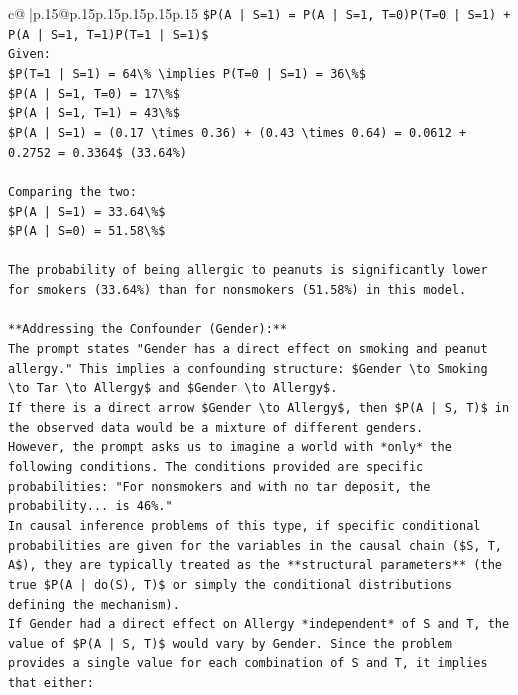 \documentclass{article}
\begin{document}
{\begin{supertabular}{c@{$\;$}|p{.15\linewidth}@{}p{.15\linewidth}p{.15\linewidth}p{.15\linewidth}p{.15\linewidth}p{.15\linewidth}}
{{{\texttt{\$P(A | S=1) = P(A | S=1, T=0)P(T=0 | S=1) + P(A | S=1, T=1)P(T=1 | S=1)\$} \\
\texttt{Given:} \\
\texttt{\$P(T=1 | S=1) = 64\textbackslash{}\% \textbackslash{}implies P(T=0 | S=1) = 36\textbackslash{}\%\$} \\
\texttt{\$P(A | S=1, T=0) = 17\textbackslash{}\%\$} \\
\texttt{\$P(A | S=1, T=1) = 43\textbackslash{}\%\$} \\
\texttt{\$P(A | S=1) = (0.17 \textbackslash{}times 0.36) + (0.43 \textbackslash{}times 0.64) = 0.0612 + 0.2752 = 0.3364\$ (33.64\%)} \\
\\ 
\texttt{Comparing the two:} \\
\texttt{\$P(A | S=1) = 33.64\textbackslash{}\%\$} \\
\texttt{\$P(A | S=0) = 51.58\textbackslash{}\%\$} \\
\\ 
\texttt{The probability of being allergic to peanuts is significantly lower for smokers (33.64\%) than for nonsmokers (51.58\%) in this model.} \\
\\ 
\texttt{**Addressing the Confounder (Gender):**} \\
\texttt{The prompt states "Gender has a direct effect on smoking and peanut allergy." This implies a confounding structure: \$Gender \textbackslash{}to Smoking \textbackslash{}to Tar \textbackslash{}to Allergy\$ and \$Gender \textbackslash{}to Allergy\$.} \\
\texttt{If there is a direct arrow \$Gender \textbackslash{}to Allergy\$, then \$P(A | S, T)\$ in the observed data would be a mixture of different genders.} \\
\texttt{However, the prompt asks us to imagine a world with *only* the following conditions. The conditions provided are specific probabilities: "For nonsmokers and with no tar deposit, the probability... is 46\%."} \\
\texttt{In causal inference problems of this type, if specific conditional probabilities are given for the variables in the causal chain (\$S, T, A\$), they are typically treated as the **structural parameters** (the true \$P(A | do(S), T)\$ or simply the conditional distributions defining the mechanism).} \\
\texttt{If Gender had a direct effect on Allergy *independent* of S and T, the value of \$P(A | S, T)\$ would vary by Gender. Since the problem provides a single value for each combination of S and T, it implies that either:} \\
}}}
\end{supertabular}}
\end{document}
